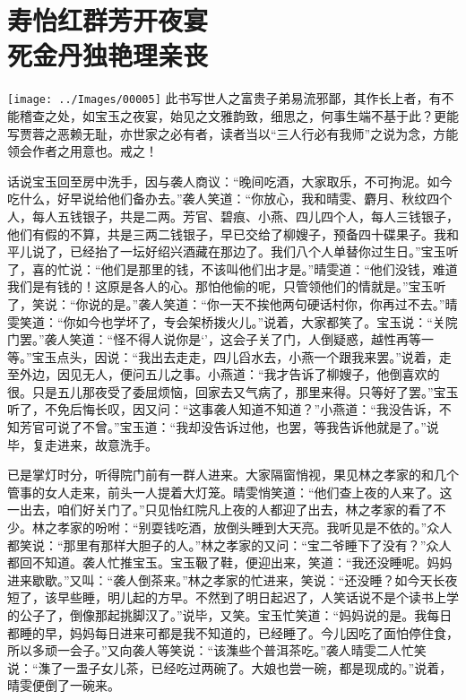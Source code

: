 

\chapter{寿怡红群芳开夜宴\\死金丹独艳理亲丧}

{\texttt{[image: ../Images/00005]} \kaishu 此书写世人之富贵子弟易流邪鄙，其作长上者，有不能稽查之处，如宝玉之夜宴，始见之文雅韵致，细思之，何事生端不基于此？更能写贾蓉之恶赖无耻，亦世家之必有者，读者当以``三人行必有我师''之说为念，方能领会作者之用意也。戒之！}

话说宝玉回至房中洗手，因与袭人商议：``晚间吃酒，大家取乐，不可拘泥。如今吃什么，好早说给他们备办去。''袭人笑道：``你放心，我和晴雯、麝月、秋纹四个人，每人五钱银子，共是二两。芳官、碧痕、小燕、四儿四个人，每人三钱银子，他们有假的不算，共是三两二钱银子，早已交给了柳嫂子，预备四十碟果子。我和平儿说了，已经抬了一坛好绍兴酒藏在那边了。我们八个人单替你过生日。''宝玉听了，喜的忙说：``他们是那里的钱，不该叫他们出才是。''晴雯道：``他们没钱，难道我们是有钱的！这原是各人的心。那怕他偷的呢，只管领他们的情就是。''宝玉听了，笑说：``你说的是。''袭人笑道：``你一天不挨他两句硬话村你，你再过不去。''晴雯笑道：``你如今也学坏了，专会架桥拨火儿。''说着，大家都笑了。宝玉说：``关院门罢。''袭人笑道：``怪不得人说你是`'，这会子关了门，人倒疑惑，越性再等一等。''宝玉点头，因说：``我出去走走，四儿舀水去，小燕一个跟我来罢。''说着，走至外边，因见无人，便问五儿之事。小燕道：``我才告诉了柳嫂子，他倒喜欢的很。只是五儿那夜受了委屈烦恼，回家去又气病了，那里来得。只等好了罢。''宝玉听了，不免后悔长叹，因又问：``这事袭人知道不知道？''小燕道：``我没告诉，不知芳官可说了不曾。''宝玉道：``我却没告诉过他，也罢，等我告诉他就是了。''说毕，复走进来，故意洗手。

已是掌灯时分，听得院门前有一群人进来。大家隔窗悄视，果见林之孝家的和几个管事的女人走来，前头一人提着大灯笼。晴雯悄笑道：``他们查上夜的人来了。这一出去，咱们好关门了。''只见怡红院凡上夜的人都迎了出去，林之孝家的看了不少。林之孝家的吩咐：``别耍钱吃酒，放倒头睡到大天亮。我听见是不依的。''众人都笑说：``那里有那样大胆子的人。''林之孝家的又问：``宝二爷睡下了没有？''众人都回不知道。袭人忙推宝玉。宝玉靸了鞋，便迎出来，笑道：``我还没睡呢。妈妈进来歇歇。''又叫：``袭人倒茶来。''林之孝家的忙进来，笑说：``还没睡？如今天长夜短了，该早些睡，明儿起的方早。不然到了明日起迟了，人笑话说不是个读书上学的公子了，倒像那起挑脚汉了。''说毕，又笑。宝玉忙笑道：``妈妈说的是。我每日都睡的早，妈妈每日进来可都是我不知道的，已经睡了。今儿因吃了面怕停住食，所以多顽一会子。''又向袭人等笑说：``该潗些个普洱茶吃。''袭人晴雯二人忙笑说：``潗了一盄子女儿茶，已经吃过两碗了。大娘也尝一碗，都是现成的。''说着，晴雯便倒了一碗来。

